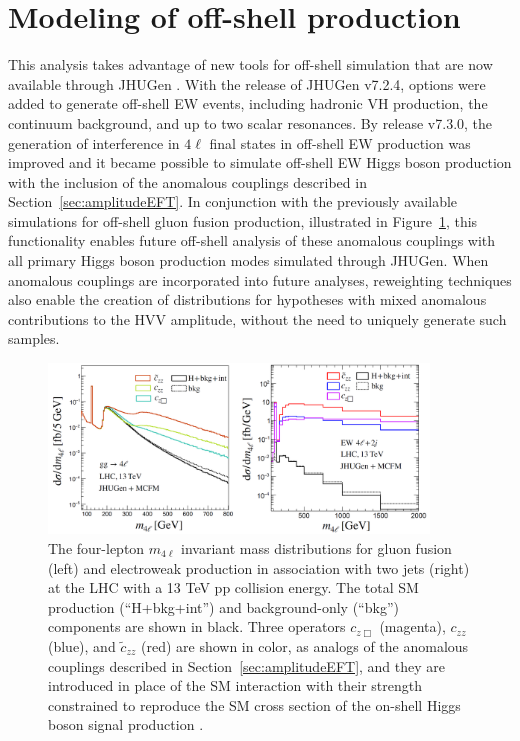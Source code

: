 
\section{Modeling of off-shell production}


This analysis takes advantage of new tools for off-shell simulation that are now available through JHUGen \cite{2010,2012,2014,2016,2020,2021}. With the release of JHUGen v7.2.4, options were added to generate off-shell EW events, including hadronic VH production, the continuum background, and up to two scalar resonances. By release v7.3.0, the generation of interference in $4\ell$ final states in off-shell EW production was improved and it became possible to simulate off-shell EW Higgs boson production with the inclusion of the anomalous couplings described in Section~\ref{sec:amplitudeEFT}. In conjunction with the previously available simulations for off-shell gluon fusion production, illustrated in Figure~\ref{fig:offshellAC_BSI}, this functionality enables future off-shell analysis of these anomalous couplings with all primary Higgs boson production modes simulated through JHUGen. When anomalous couplings are incorporated into future analyses, reweighting techniques also enable the creation of distributions for hypotheses with mixed anomalous contributions to the HVV amplitude, without the need to uniquely generate such samples. 

\begin{figure}[!hbt]
\centering
\includegraphics[width=0.9\textwidth,clip] {figures/offshellAC_BSI.png}
\caption{ The four-lepton $m_{4\ell}$ invariant mass distributions for gluon fusion (left) and electroweak production in association with two jets (right) at the LHC with a 13 TeV pp collision energy. The total SM production (“H+bkg+int”) and background-only (“bkg”) components are shown in black. Three operators $c_{z\Box}$ (magenta), $c_{zz}$ (blue), and $\tilde{c}_{zz}$ (red) are shown in color, as analogs of the anomalous couplings described in Section~\ref{sec:amplitudeEFT}, and they are introduced in place of the SM interaction with their strength constrained to reproduce the SM cross section of the on-shell Higgs boson signal production \cite{offshellWGnote}.}
\label{fig:offshellAC_BSI}
\end{figure}


